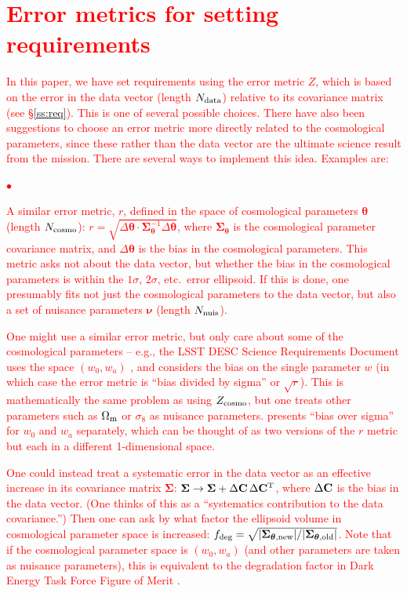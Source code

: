 \documentclass[usenatbib]{mnras}
\newcommand{\changetext}[1]{\textcolor{red}{#1}}
\begin{document}
\section{\changetext{Error metrics for setting requirements}}
\label{app:reqpar}

\changetext{In this paper, we have set requirements using the error metric $Z$, which is based on the error in the data vector (length $N_{\rm data}$) relative to its covariance matrix (see \S\ref{ss:req}). This is one of several possible choices. There have also been suggestions to choose an error metric more directly related to the cosmological parameters, since these rather than the data vector are the ultimate science result from the mission. There are several ways to implement this idea. Examples are:
\begin{list}{$\bullet$}{}
\item A similar error metric, $r$, defined in the space of cosmological parameters ${\boldsymbol\theta}$ (length $N_{\rm cosmo}$): $r = \sqrt{\Delta{\boldsymbol\theta} \cdot {\boldsymbol\Sigma}_{\boldsymbol\theta}^{-1} \Delta{\boldsymbol\theta}}$, where ${\boldsymbol\Sigma}_{\boldsymbol\theta}$ is the cosmological parameter covariance matrix, and $\Delta{\boldsymbol\theta}$ is the bias in the cosmological parameters. This metric asks not about the data vector, but whether the bias in the cosmological parameters is within the $1\sigma$, $2\sigma$, etc.\ error ellipsoid. If this is done, one presumably fits not just the cosmological parameters to the data vector, but also a set of nuisance parameters ${\boldsymbol\nu}$ (length $N_{\rm nuis}$).
\item One might use a similar error metric, but only care about some of the cosmological parameters -- e.g., the LSST DESC Science Requirements Document uses the space $(w_0,w_a)$ \citep{2018arXiv180901669T}, and \citet{2013MNRAS.429..661M} considers the bias on the single parameter $w$ (in which case the error metric is ``bias divided by sigma'' or $\sqrt r$). This is mathematically the same problem as using $Z_{\rm cosmo}$, but one treats other parameters such as $\Omega_{\rm m}$ or $\sigma_8$ as nuisance parameters. \citet{2020A&A...635A.139E} presents ``bias over sigma'' for $w_0$ and $w_a$ separately, which can be thought of as two versions of the $r$ metric but each in a different 1-dimensional space.
\item One could instead treat a systematic error in the data vector as an effective increase in its covariance matrix ${\boldsymbol\Sigma}$: ${\boldsymbol\Sigma} \rightarrow {\boldsymbol\Sigma} + \Delta{\bf C}\,\Delta{\bf C}^{\rm T}$, where $\Delta{\bf C}$ is the bias in the data vector. (One thinks of this as a ``systematics contribution to the data covariance.'') Then one can ask by what factor the ellipsoid volume in cosmological parameter space is increased: $f_{\rm deg} = \sqrt{|{\boldsymbol\Sigma}_{{\boldsymbol\theta},\rm new}|/|{\boldsymbol\Sigma}_{{\boldsymbol\theta},\rm old}|}$. Note that if the cosmological parameter space is $(w_0,w_a)$ (and other parameters are taken as nuisance parameters), this is equivalent to the degradation factor in Dark Energy Task Force Figure of Merit \citep{detf}.

\end{list}}
\end{document}
